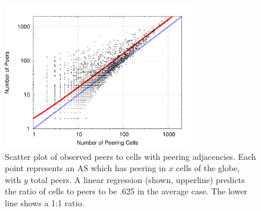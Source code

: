 
    \begin{figure}[tb]
\centering
\includegraphics[width=3.25in]{scatter}
\caption[]{\label{fig:scatter} Scatter plot of observed peers to cells with peering adjacencies. Each point represents an AS which has peering in $x$ cells of the globe, with $y$ total peers. A linear regression (shown, upperline) predicts the ratio of cells to peers to be .625 in the average case. The lower line shows a 1:1 ratio.} 
\end{figure}

